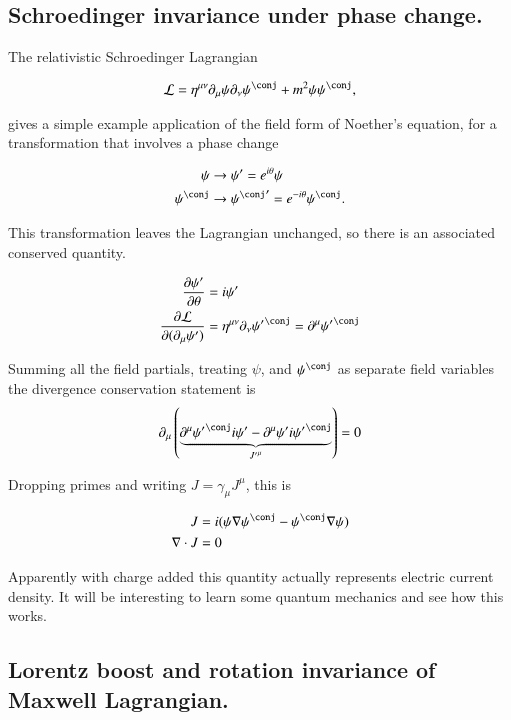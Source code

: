 \documentclass{article}
\begin{document}
\subsection{ Schroedinger invariance under phase change. }

The relativistic Schroedinger Lagrangian

\begin{align*}
\LL = \eta^{\mu\nu}\partial_\mu \psi \partial_\nu \psi^\conj + m^2 \psi \psi^\conj,
\end{align*}

gives a simple example application of the field form of Noether's equation, for a 
transformation that involves a phase change

\begin{align*}
\psi &\rightarrow \psi' = e^{i\theta}\psi \\
\psi^\conj &\rightarrow {\psi^\conj}' = e^{-i\theta}\psi^\conj.
\end{align*}

This transformation leaves the Lagrangian unchanged, so there is an associated conserved
quantity.

\begin{align*}
\PD{\theta}{\psi'} &= i \psi' \\
\PD{(\partial_\mu \psi')}{\LL} &= \eta^{\mu\nu}\partial_\nu {\psi'}^\conj = \partial^\mu {\psi'}^\conj 
\end{align*}

Summing all the field partials, treating $\psi$, and $\psi^\conj$ as separate
field variables the divergence conservation statement is
\begin{align*}
\partial_\mu \left(
\underbrace{
\partial^\mu {\psi'}^\conj i\psi'
-\partial^\mu {\psi'} i{\psi'}^\conj
}_{{J'}^\mu}
\right) = 0
\end{align*}

Dropping primes and writing $J = \gamma_\mu J^\mu$, this is

\begin{align*}
J &= i (\psi \grad {\psi}^\conj - \psi^\conj \grad {\psi} ) \\
\grad \cdot J &= 0
\end{align*}

Apparently with charge added this quantity actually represents electric current density.  It will be interesting to
learn some quantum mechanics and see how this works.

\subsection{ Lorentz boost and rotation invariance of Maxwell Lagrangian. }
\end{document}
